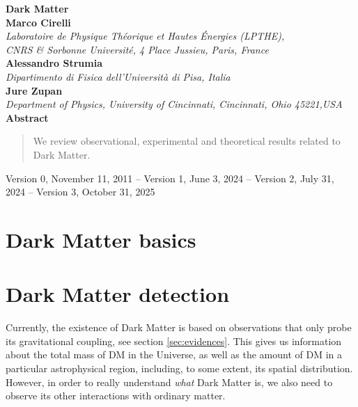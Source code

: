 \documentclass[twoside,12pt,openany]{book}
\begin{document}
\color{black}\thispagestyle{empty}
\phantom{X}\vspace{0.1\textheight}
\begin{center}
{\Huge\color{rossos}\bfseries\bf Dark Matter}\\[0.1\textheight]
{\large\bf Marco Cirelli}\\[1ex]
{\em Laboratoire de Physique Th\'eorique et Hautes \'Energies (LPTHE),}\\
{\em CNRS \& Sorbonne Universit\'e, 4 Place Jussieu, Paris, France}\\[2ex]
{\large\bf Alessandro Strumia}\\[1ex]
{\em Dipartimento di Fisica dell'Universit\`a di Pisa, Italia}\\[2ex]
{\large\bf Jure Zupan}\\[1ex]
{\em Department of Physics, University of Cincinnati, Cincinnati, Ohio 45221,USA}\\[8ex]
{\large\bf\color{blue!50!black} Abstract}\\[1ex]
\begin{quote}\color{blue!50!black} 
We review observational, experimental and theoretical results related to Dark Matter.
\end{quote}
\color{black}



\vfill
\centerline{\footnotesize \hfill Version 0, November 11, 2011 -- Version 1, June 3, 2024 -- Version 2, July 31, 2024 -- Version 3, October 31, 2025 \hfill}
\end{center}

\newpage


\setcounter{tocdepth}{2}
 {\tableofcontents}


\label{part:intriduction}



\part{Dark Matter basics}\label{part:basic}






\part{Dark Matter detection}
\label{part:detection}

\noindent
Currently, the existence of Dark Matter is based on observations that only probe its gravitational coupling, see section \ref{sec:evidences}. This gives us information about the total mass of DM in the Universe, as well as the amount of DM in a particular astrophysical region, including, to some extent, its spatial  distribution. However, in order to really understand {\em what} Dark Matter is, we also need to observe its other interactions with ordinary matter.
\smallskip
\end{document}
